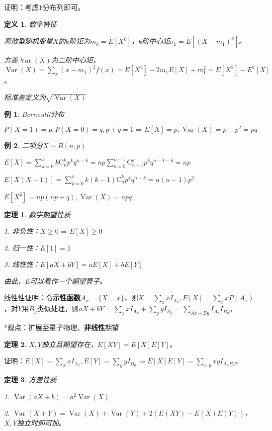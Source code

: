 \documentclass[a4paper,UTF8,fontset=windows]{ctexart}
\newtheorem{thm}{定理}[section]
\newtheorem{exmp}{例}[section]
\newtheorem{defi}{定义}[section]
\DeclareMathOperator{\Var}{Var}
\begin{document}
证明：考虑$Y$分布列即可。

\begin{defi} 数字特征

离散型随机变量$X$的$k$阶矩为$m_k=E[X^k]$，$k$阶中心矩$\sigma_k=E[(X-m_1)^k]$。

方差$\Var(X)$为二阶中心矩，$\Var(X)=\sum_x(x-m_1)^2f(x)=E[X^2]-2m_1E[X]+m_1^2=E[X^2]-E^2[X]$。

标准差定义为$\sqrt{\Var(X)}$
\end{defi}

\begin{exmp} Bernoulli分布
	
$P(X=1)=p,P(X=0)=q,p+q=1\Rightarrow E[X]=p,\Var(X)=p-p^2=pq$
\end{exmp}

\begin{exmp} 二项分$X\sim B(n,p)$
	
$E[X]=\sum_{k=0}^nk\mathrm{C}_n^kp^kq^{n-k}=np\sum_{k=0}^{n-1}\mathrm{C}_{n-1}^kp^kq^{n-1-k}=np$

$E[X(X-1)]=\sum_{k=0}^nk(k-1)\mathrm{C}_n^kp^kq^{n-k}=n(n-1)p^2$

$E[X^2]=np(np+q),\Var(X)=npq$
\end{exmp}

\begin{thm} 数学期望性质

1. 非负性：$X\ge0\Rightarrow E[X]\ge0$

2. 归一性：$E[1]=1$

3. 线性性：$E[aX+bY]=aE[X]+bE[Y]$

由此，$E$可以看作一个期望算子。
\end{thm}

线性性证明：令\textbf{示性函数}$A_x=\{X=x\}$，则$X=\sum_xxI_{A_x},E[X]=\sum_xxP(A_x)$，对$Y$用$B_y$类似处理，则$aX+bY=\sum_xxI_{A_x}+\sum_yyI_{B_y}=\sum_{Ax+By}I_{A_x}I_{B_y}$。

*观点：扩展至量子物理、\textbf{非线性}期望

\begin{thm}
$X,Y$独立且期望存在，$E[XY]=E[X]E[Y]$。
\end{thm}

证明：$E[X]=\sum_xxI_{A_x},E[Y]=\sum_yyI_{B_y}\Rightarrow E[X]E[Y]=\sum_{x,y}xyI_{A_xB_y}$。

\begin{thm} 方差性质

1. $\Var(aX+b)=a^2\Var(X)$

2. $\Var(X+Y)=\Var(X)+\Var(Y)+2(E(XY)-E(X)E(Y))$，$X,Y$独立时即可加。
\end{thm}
\end{document}
